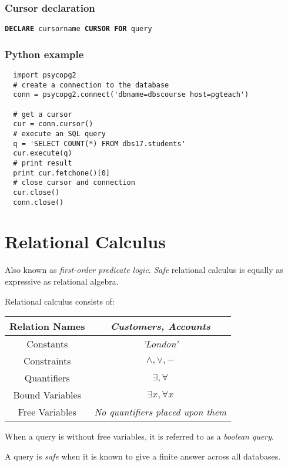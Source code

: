 \documentclass{article}
\begin{document}
\subsubsection*{Cursor declaration}
\texttt{\textbf{DECLARE} cursorname \textbf{CURSOR FOR} query}

\subsubsection*{Python example}
\begin{verbatim}
  import psycopg2
  # create a connection to the database
  conn = psycopg2.connect('dbname=dbscourse host=pgteach')
  
  # get a cursor
  cur = conn.cursor()
  # execute an SQL query
  q = 'SELECT COUNT(*) FROM dbs17.students'
  cur.execute(q)
  # print result
  print cur.fetchone()[0]
  # close cursor and connection
  cur.close()
  conn.close()
\end{verbatim}
\section{Relational Calculus}

Also known as \textit{first-order predicate logic}. \textit{Safe} relational calculus is equally as expressive as relational algebra.

Relational calculus consists of:

\begin{center}
  \begin{tabular}{|c|c|}
    \hline
    Relation Names  & \textit{Customers, Accounts}             \\
    \hline
    Constants       & \textit{'London'}                        \\
    \hline
    Constraints     & $\wedge, \vee, -$                        \\
    \hline
    Quantifiers     & $\exists, \forall$                       \\
    \hline
    Bound Variables & $\exists x, \forall x$                   \\
    \hline
    Free Variables  & \textit{No quantifiers placed upon them} \\
    \hline
  \end{tabular}
\end{center}

When a query is without free variables, it is referred to as a \textit{boolean query}.

A query is \textit{safe} when it is known to give a finite answer across all databases.
\end{document}
